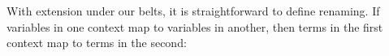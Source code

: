 With extension under our belts, it is straightforward to define
renaming. If variables in one context map to variables in another, then
terms in the first context map to terms in the second:

\begin{fence}
\begin{code}%
\>[0]\AgdaSpace{}%
\AgdaSymbol{:}\AgdaSpace{}%
\AgdaSpace{}%
\AgdaSymbol{\{}\AgdaSpace{}%
\AgdaSymbol{\}}\<%
\\
\>[0][@{}l@{\AgdaIndent{0}}]%
\>[2]%
\>[646I]\AgdaSpace{}%
\AgdaSymbol{\{}\AgdaSymbol{\}}\AgdaSpace{}%
\AgdaSpace{}%
\AgdaSpace{}%
\AgdaSpace{}%
\AgdaSpace{}%
\AgdaSpace{}%
\AgdaSpace{}%
\AgdaSpace{}%
\AgdaSymbol{)}\<%
\\
\>[.][@{}l@{}]\<[646I]%
\>[4]\AgdaComment{-----------------------}\<%
\\
%
\>[2]\AgdaSpace{}%
\AgdaSpace{}%
\AgdaSymbol{\{}\AgdaSymbol{\}}\AgdaSpace{}%
\AgdaSpace{}%
\AgdaSpace{}%
\AgdaSpace{}%
\AgdaSpace{}%
\AgdaSpace{}%
\AgdaSpace{}%
\AgdaSpace{}%
\AgdaSymbol{)}\<%
\\
\>[0]\AgdaSpace{}%
\AgdaSpace{}%
\AgdaSymbol{(}\AgdaSpace{}%
\AgdaSymbol{)}%
\>[24]\AgdaSymbol{=}%
\>[27]\AgdaSpace{}%
\AgdaSymbol{(}\AgdaSpace{}%
\AgdaSymbol{)}\<%
\\
\>[0]\AgdaSpace{}%
\AgdaSpace{}%
\AgdaSymbol{(}\AgdaSpace{}%
\AgdaSymbol{)}%
\>[24]\AgdaSymbol{=}%
\>[27]\AgdaSpace{}%
\AgdaSymbol{(}\AgdaSpace{}%
\AgdaSymbol{(}\AgdaSpace{}%
\AgdaSymbol{)}\AgdaSpace{}%
\AgdaSymbol{)}\<%
\\
\>[0]\AgdaSpace{}%
\AgdaSpace{}%
\AgdaSymbol{(}\AgdaSpace{}%
\AgdaSpace{}%
\AgdaSymbol{)}%
\>[24]\AgdaSymbol{=}%
\>[27]\AgdaSymbol{(}\AgdaSpace{}%

\end{code}
\end{fence}
